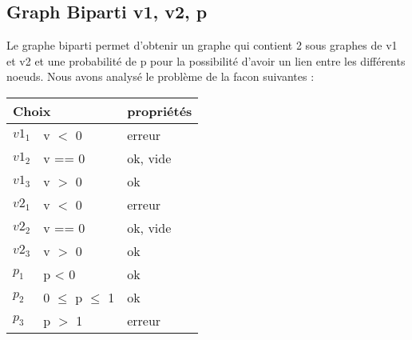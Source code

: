 \documentclass[11pt]{article}
\begin{document}
\subsection{Graph Biparti v1, v2, p}
Le graphe biparti permet d'obtenir un graphe qui contient 2 sous graphes de v1 et v2 et une probabilité de p pour la possibilité d'avoir un lien entre les différents noeuds.
Nous avons analysé le problème de la facon suivantes :
\begin{tabular}{|l|l|l|}
 \hline
 \multicolumn{2}{|l|}{Choix} & propriétés                   \\ \hline
 ${v1}_1$                    & v $<$ 0           & erreur   \\ \hline
 ${v1}_2$                    & v == 0            & ok, vide \\ \hline
 ${v1}_3$                    & v $>$ 0           & ok       \\ \hline \hline
 ${v2}_1$                    & v $<$ 0           & erreur   \\ \hline
 ${v2}_2$                    & v == 0            & ok, vide \\ \hline
 ${v2}_3$                    & v $>$ 0           & ok       \\ \hline \hline
 $p_1$                       & p < 0             & ok       \\ \hline
 $p_2$                       & 0 $\le$ p $\le$ 1 & ok       \\ \hline
 $p_3$                       & p $>$ 1           & erreur   \\ \hline
\end{tabular}
\end{document}
